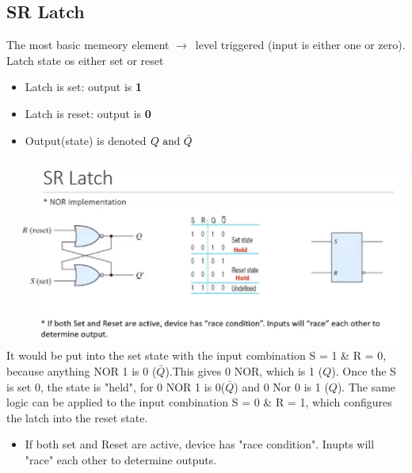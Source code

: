 \documentclass[a4paper,12pt]{article}
\newcommand{\ra}{$\rightarrow$}
\begin{document}
    \subsection{SR Latch}
        The most basic memeory element \ra~level triggered (input is either one or zero). Latch state os either set or reset
        \begin{itemize}
            \item Latch is set: output is \textbf{1}
            \item Latch is reset: output is \textbf{0}
            \item Output(state) is denoted \(Q~\textnormal{and}~\bar{Q}\)
        \end{itemize}
        \includegraphics[width=15cm]{SRlatchDiagram1.png} \\
        It would be put into the set state with the input combination S = 1 \& R = 0, because anything NOR 1 is 0 ($\bar{Q}$).This gives 0 NOR, which is 1 ($Q$). Once the S is set 0, the state is "held", for 0 NOR 1 is 0($\bar{Q}$) and 0 Nor 0 is 1 ($Q$). The same logic can be applied to the input combination S = 0 \& R = 1, which configures the latch into the reset state.
        \begin{itemize}
            \item If both set and Reset are active, device has "race condition". Inupts will "race" each other to determine outputs.
        \end{itemize}
\end{document}
